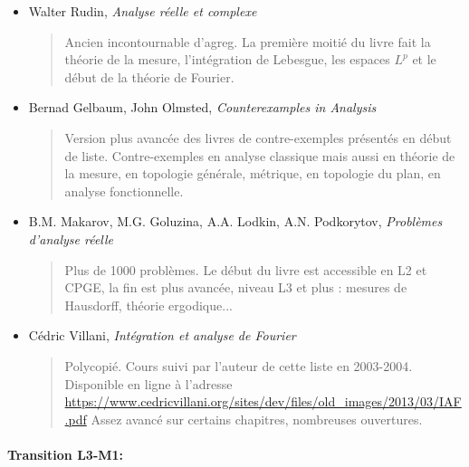 \documentclass{article}
\begin{document}
\begin{itemize}
\item Walter Rudin, \emph{Analyse réelle et complexe}
\begin{quote}
Ancien incontournable d'agreg. La première moitié du livre fait la théorie de la mesure,  l'intégration de Lebesgue, les espaces $L^p$ et le début de la théorie de Fourier.
\end{quote}
\item Bernad Gelbaum, John Olmsted, \emph{Counterexamples in Analysis}
\begin{quote}
Version plus avancée des livres de contre-exemples présentés en début de liste. Contre-exemples en analyse classique mais aussi en théorie de la mesure, en topologie générale, métrique, en topologie du plan, en analyse fonctionnelle.
\end{quote}
\item B.M. Makarov, M.G. Goluzina, A.A. Lodkin, A.N. Podkorytov, \emph{Problèmes d'analyse réelle}
\begin{quote}
Plus de 1000 problèmes. Le début du livre est accessible en L2 et CPGE, la fin est plus avancée, niveau L3 et plus : mesures de Hausdorff, théorie ergodique...
\end{quote}
\item Cédric Villani, \emph{Intégration et analyse de Fourier}
\begin{quote}
Polycopié. Cours suivi par l'auteur de cette liste en 2003-2004. Disponible en ligne à l'adresse \url{https://www.cedricvillani.org/sites/dev/files/old_images/2013/03/IAF.pdf} Assez avancé sur certains chapitres, nombreuses ouvertures.
\end{quote}
\end{itemize}

\paragraph{Transition L3-M1:}
\end{document}

